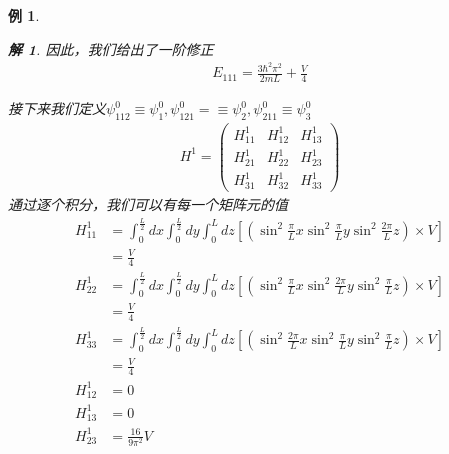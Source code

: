 \documentclass{article}
\newtheorem{example}{例}
\newtheorem{solution}{解}
\begin{document}
\begin{example}
\begin{solution}
		因此，我们给出了一阶修正
		\begin{align*}
			E_{111}=\frac{3\hbar^2\pi^2}{2mL}+\frac{V}{4}
		\end{align*}

		接下来我们定义$\psi_{112}^0\equiv\psi_1^0,\psi_{121}^0=\equiv\psi_2^0,\psi_{211}^0\equiv\psi_3^0$
		\begin{align*}
			H^1=
			\begin{pmatrix}
				H_{11}^1 & H_{12}^1 & H_{13}^1 \\
				H_{21}^1 & H_{22}^1 & H_{23}^1 \\
				H_{31}^1 & H_{32}^1 & H_{33}^1
			\end{pmatrix}
		\end{align*}
		通过逐个积分，我们可以有每一个矩阵元的值
		\begin{align*}
			H_{11}^1 & =\int_{0}^{\frac{L}{2}} dx\int_{0}^{\frac{L}{2}} dy\int_{0}^{L} dz \left[\left(\sin^2{\frac{\pi}{L}x}\sin^2{\frac{\pi}{L}y}\sin^2{\frac{2\pi}{L}z}\right)\times V\right] \\
			         & =\frac{V}{4}                                                                                                                                                             \\
			H_{22}^1 & =\int_{0}^{\frac{L}{2}} dx\int_{0}^{\frac{L}{2}} dy\int_{0}^{L} dz \left[\left(\sin^2{\frac{\pi}{L}x}\sin^2{\frac{2\pi}{L}y}\sin^2{\frac{\pi}{L}z}\right)\times V\right] \\
			         & =\frac{V}{4}                                                                                                                                                             \\
			H_{33}^1 & =\int_{0}^{\frac{L}{2}} dx\int_{0}^{\frac{L}{2}} dy\int_{0}^{L} dz \left[\left(\sin^2{\frac{2\pi}{L}x}\sin^2{\frac{\pi}{L}y}\sin^2{\frac{\pi}{L}z}\right)\times V\right] \\
			         & =\frac{V}{4}                                                                                                                                                             \\
			H_{12}^1 & =0                                                                                                                                                                       \\
			H_{13}^1 & =0                                                                                                                                                                       \\
			H_{23}^1 & =\frac{16}{9\pi^2}V
		\end{align*}


\end{solution}
\end{example}
\end{document}
